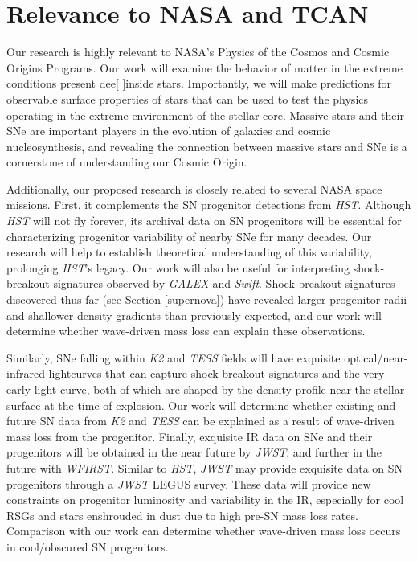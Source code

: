 {\color{orange}

\section{Relevance to NASA and TCAN}



Our research is highly relevant to NASA's Physics of the Cosmos and Cosmic Origins Programs. Our work will examine the behavior of matter in the extreme conditions present dee[ ]inside stars. Importantly, we will make predictions for observable surface properties of stars that can be used to test the physics operating in the extreme environment of the stellar core. Massive stars and their SNe are important players in the evolution of galaxies and cosmic nucleosynthesis, and revealing the connection between massive stars and SNe is a cornerstone of understanding our Cosmic Origin.

Additionally, our proposed research is closely related to several NASA space missions. First, it complements the SN progenitor detections from {\it HST}. Although {\it HST} will not fly forever, its archival data on SN progenitors will be essential for characterizing progenitor variability of nearby SNe for many decades. Our research will help to establish theoretical understanding of this variability, prolonging {\it HST}'s legacy. Our work will also be useful for interpreting shock-breakout signatures observed by {\it GALEX} and {\it Swift}. Shock-breakout signatures discovered thus far (see Section \ref{supernova}) have revealed larger progenitor radii and shallower density gradients than previously expected, and our work will determine whether wave-driven mass loss can explain these observations.

Similarly, SNe falling within {\it K2} and {\it TESS} fields will have exquisite optical/near-infrared lightcurves that can capture shock breakout signatures and the very early light curve, both of which are shaped by the density profile near the stellar surface at the time of explosion. Our work will determine whether existing and future SN data from {\it K2} and {\it TESS} can be explained as a result of wave-driven mass loss from the progenitor. Finally, exquisite IR data on SNe and their progenitors will be obtained in the near future by {\it JWST}, and further in the future with {\it WFIRST}. Similar to {\it HST}, {\it JWST} may provide exquisite data on SN progenitors through a {\it JWST} LEGUS survey. These data will provide new constraints on progenitor luminosity and variability in the IR, especially for cool RSGs and stars enshrouded in dust due to high pre-SN mass loss rates. Comparison with our work can determine whether wave-driven mass loss occurs in cool/obscured SN progenitors.


}
